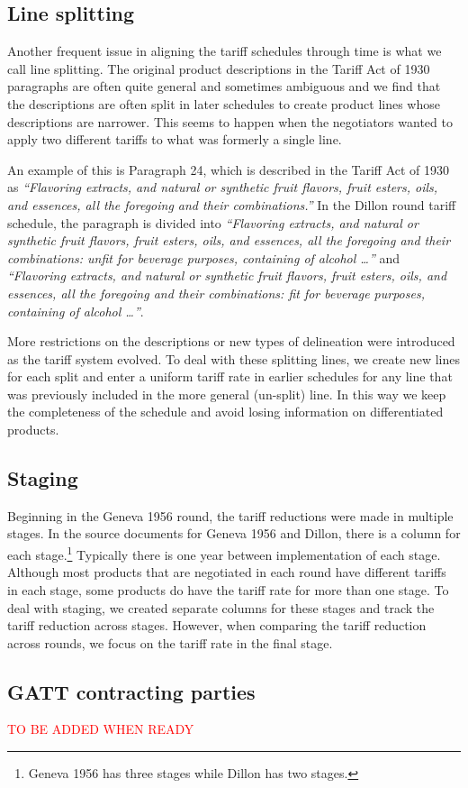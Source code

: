 \documentclass[
  12pt,
]{article}
\begin{document}
\hypertarget{split}{%
\subsection{Line splitting}\label{split}}

Another frequent issue in aligning the tariff schedules through time is what we call line splitting. The original product descriptions in the Tariff Act of 1930 paragraphs are often quite general and sometimes ambiguous and we find that the descriptions are often split in later schedules to create product lines whose descriptions are narrower. This seems to happen when the negotiators wanted to apply two different tariffs to what was formerly a single line.

An example of this is Paragraph 24, which is described in the Tariff Act of 1930 as \emph{``Flavoring extracts, and natural or synthetic fruit flavors, fruit esters, oils, and essences, all the foregoing and their combinations.''} In the Dillon round tariff schedule, the paragraph is divided into \emph{``Flavoring extracts, and natural or synthetic fruit flavors, fruit esters, oils, and essences, all the foregoing and their combinations: unfit for beverage purposes, containing of alcohol \ldots{}''} and \emph{``Flavoring extracts, and natural or synthetic fruit flavors, fruit esters, oils, and essences, all the foregoing and their combinations: fit for beverage purposes, containing of alcohol \ldots{}''}.

More restrictions on the descriptions or new types of delineation were introduced as the tariff system evolved. To deal with these splitting lines, we create new lines for each split and enter a uniform tariff rate in earlier schedules for any line that was previously included in the more general (un-split) line. In this way we keep the completeness of the schedule and avoid losing information on differentiated products.

\hypertarget{staging}{%
\subsection{Staging}\label{staging}}

Beginning in the Geneva 1956 round, the tariff reductions were made in multiple stages. In the source documents for Geneva 1956 and Dillon, there is a column for each stage.\footnote{Geneva 1956 has three stages while Dillon has two stages.} Typically there is one year between implementation of each stage. Although most products that are negotiated in each round have different tariffs in each stage, some products do have the tariff rate for more than one stage. To deal with staging, we created separate columns for these stages and track the tariff reduction across stages. However, when comparing the tariff reduction across rounds, we focus on the tariff rate in the final stage.

\hypertarget{gatt-contracting-parties}{%
\subsection{GATT contracting parties}\label{gatt-contracting-parties}}

\textcolor{red}{TO BE ADDED WHEN READY}
\end{document}
